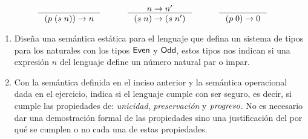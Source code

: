 \documentclass{article}
\begin{document}
\begin{enumerate}
        \[
        \begin{array}{ccccc}
            \inference{}{(p\;(s\;n))\to n}&
            \quad&
            \inference{n\to n'}{(s\;n)\to(s\;n')}&
            \quad&
            \inference{}{(p\;0)\to 0}
        \end{array}
        \]

        \begin{enumerate}
            \item Diseña una semántica estática para el lenguaje que defina un sistema de tipos para los naturales con los tipos ${\sf Even}$ y ${\sf Odd}$, estos tipos nos indican si una expresión $n$ del lenguaje define un número natural par o impar.
            \item Con la semántica definida en el inciso anterior y la semántica operacional dada en el ejercicio, indica si el lenguaje cumple con ser seguro, es decir, si cumple las propiedades de: {\it unicidad}, {\it preservación} y ${\it progreso}$. No es necesario dar una demostración formal de las propiedades sino una justificación del por qué se cumplen o no cada una de estas propiedades.
        \end{enumerate}
    \end{enumerate}
\end{document}
